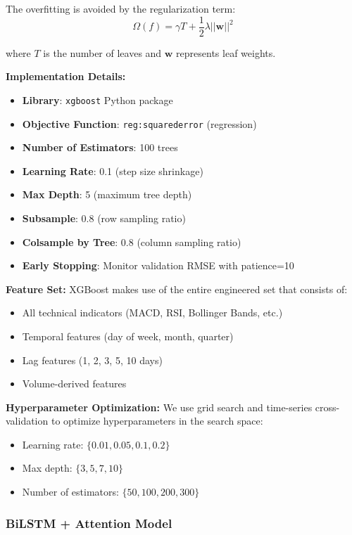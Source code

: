 The overfitting is avoided by the regularization term:
\begin{equation}
\Omega(f) = \gamma T + \frac{1}{2}\lambda ||\mathbf{w}||^2
\end{equation}

where $T$ is the number of leaves and $\mathbf{w}$ represents leaf weights.

\textbf{Implementation Details:}
\begin{itemize}
    \item \textbf{Library}: \texttt{xgboost} Python package
    \item \textbf{Objective Function}: \texttt{reg:squarederror} (regression)
    \item \textbf{Number of Estimators}: 100 trees
    \item \textbf{Learning Rate}: 0.1 (step size shrinkage)
    \item \textbf{Max Depth}: 5 (maximum tree depth)
    \item \textbf{Subsample}: 0.8 (row sampling ratio)
    \item \textbf{Colsample by Tree}: 0.8 (column sampling ratio)
    \item \textbf{Early Stopping}: Monitor validation RMSE with patience=10
\end{itemize}

\textbf{Feature Set:}
XGBoost makes use of the entire engineered set that consists of:
\begin{itemize}
    \item All technical indicators (MACD, RSI, Bollinger Bands, etc.)
    \item Temporal features (day of week, month, quarter)
    \item Lag features (1, 2, 3, 5, 10 days)
    \item Volume-derived features
\end{itemize}

\textbf{Hyperparameter Optimization:}
We use grid search and time-series cross-validation to optimize hyperparameters in the search space:
\begin{itemize}
    \item Learning rate: $\{0.01, 0.05, 0.1, 0.2\}$
    \item Max depth: $\{3, 5, 7, 10\}$
    \item Number of estimators: $\{50, 100, 200, 300\}$
\end{itemize}

\subsubsection{BiLSTM + Attention Model}

